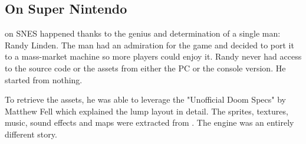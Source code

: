 \pagebreak


\par
{}
















\subsection{\doom{} On Super Nintendo}

\doom{} on SNES happened thanks to the genius and determination of a single man: Randy Linden. The man had an admiration for the game and decided to port it to a mass-market machine so more players could enjoy it. Randy never had access to the source code or the assets from either the PC or the console version. He started from nothing.\\
\par
To retrieve the assets, he was able to leverage the "Unofficial Doom Specs" by Matthew Fell which explained the  lump layout in detail. The sprites, textures, music, sound effects and maps were extracted from . The engine was an entirely different story.\\
\par

